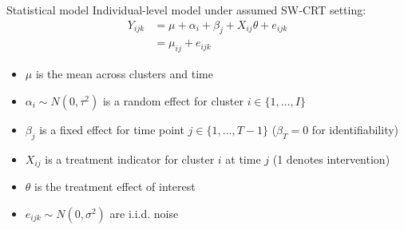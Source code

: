 \documentclass[9pt]{beamer}
\begin{document}
\begin{frame}{Statistical model}
Individual-level model under assumed SW-CRT setting:
\begin{align*}
Y_{ijk} &= \mu + \alpha_i + \beta_j + X_{ij}\theta + e_{ijk} \\
&= \mu_{ij} + e_{ijk}
\end{align*}
\begin{itemize}

\item
$\mu$ is the mean across clusters and time

\item
$\alpha_i\sim N(0,\tau^2)$ is a random effect for cluster $i\in\{1,\ldots,I\}$

\item
$\beta_j$ is a fixed effect for time point $j\in\{1,\ldots,T-1\}$ ($\beta_T=0$ for identifiability)

\item
$X_{ij}$ is a treatment indicator for cluster $i$ at time $j$ (1 denotes intervention)

\item
$\theta$ is the treatment effect of interest

\item
$e_{ijk}\sim N(0,\sigma^2)$ are i.i.d. noise

\end{itemize}
\end{frame}
\end{document}
